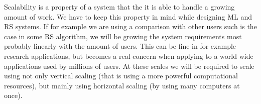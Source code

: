 Scalability is a property of a system that the it is able to handle a growing amount of work. We have to keep this property in mind while designing ML and RS systems. If for example we are using a comparison with other users such is the case in some RS algorithm, we will be growing the system requirements most probably linearly with the amount of users. This can be fine in for example research applications, but becomes a real concern when applying to a world wide applications used by millions of users. At these scales we will be required to scale using not only vertical scaling (that is using a more powerful computational resources), but mainly using horizontal scaling (by using many computers at once).





